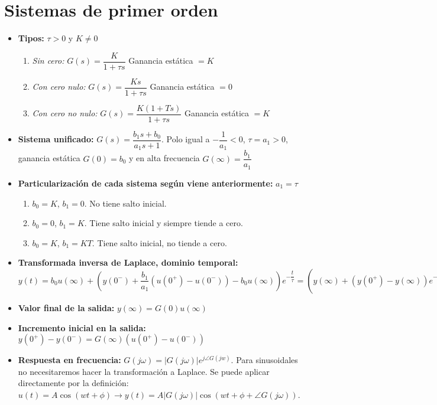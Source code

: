 \documentclass[a4paper, twocolumn, 10pt]{article}
\begin{document}
\section{Sistemas de primer orden}

\begin{itemize}
	\item \textbf{Tipos:} $\tau > 0$ y $K \neq 0$
	\begin{enumerate}
		\item \textit{Sin cero:} $G(s) = \dfrac{K}{1 + \tau s}$ Ganancia estática $= K$
		\item \textit{Con cero nulo:} $G(s) = \dfrac{Ks}{1 + \tau s}$ Ganancia estática $= 0$
		\item \textit{Con cero no nulo:} $G(s) = \dfrac{K(1 + Ts)}{1 + \tau s}$ Ganancia estática $= K$
	\end{enumerate}
	\item \textbf{Sistema unificado:} $G(s) = \dfrac{b_1s + b_0}{a_1s + 1}$. Polo igual a $-\dfrac{1}{a_1} < 0$, $\tau = a_1 > 0$, ganancia estática $G(0) = b_0$ y en alta frecuencia $G(\infty) = \dfrac{b_1}{a_1}$
	\item \textbf{Particularización de cada sistema según viene anteriormente:} $a_1 = \tau$
	\begin{enumerate}
		\item $b_0 = K$, $b_1 = 0$. No tiene salto inicial.
		\item $b_0 = 0$, $b_1 = K$. Tiene salto inicial y siempre tiende a cero.
		\item $b_0 = K$, $b_1 = KT$. Tiene salto inicial, no tiende a cero.
	\end{enumerate}
	\item \textbf{Transformada inversa de Laplace, dominio temporal:} $y(t) = b_0u(\infty) + \left(y(0^-) + \dfrac{b_1}{a_1}\left(u(0^+) - u(0^-)\right) -b_0u(\infty)\right)e^{-\dfrac{t}{\tau}} = \left(y(\infty) + \left(y(0^+) - y(\infty)\right)e^{-\dfrac{t}{\tau}}\right)\gamma(t)$
	\item \textbf{Valor final de la salida:} $y(\infty) = G(0)u(\infty)$
	\item \textbf{Incremento inicial en la salida:} $y(0^+) - y(0^-) = G(\infty)(u(0^+)- u(0^-))$
	\item \textbf{Respuesta en frecuencia:} $G(j\omega) = |G(j\omega)|e^{j\angle G(jw)}$. Para sinusoidales no necesitaremos hacer la transformación a Laplace. Se puede aplicar directamente por la definición: $u(t) = A\cos(wt + \phi) \rightarrow y(t) = A|G(j\omega)|\cos(wt + \phi + \angle G(j\omega))$.
\end{itemize}
\end{document}
